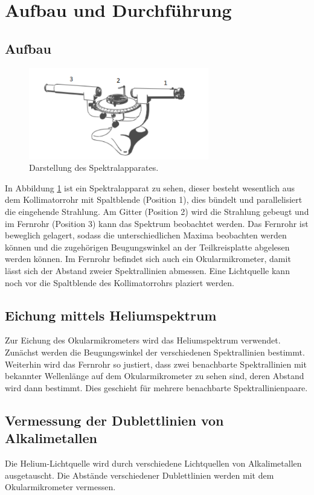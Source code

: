 \newpage
\section{Aufbau und Durchführung}
\label{sec:Durchführung}
\subsection{Aufbau}
\begin{figure}
 \centering
 \includegraphics[width=0.7\textwidth]{Aufbau.png}
 \caption{Darstellung des Spektralapparates.\cite{sample}}
 \label{fig:apparat}
 \end{figure}
In Abbildung \ref{fig:apparat} ist ein Spektralapparat zu sehen, dieser besteht wesentlich aus dem Kollimatorrohr mit Spaltblende (Position 1), dies bündelt und parallelisiert die eingehende Strahlung.
Am Gitter (Position 2) wird die Strahlung gebeugt und im Fernrohr (Position 3) kann das Spektrum beobachtet werden. Das Fernrohr ist beweglich gelagert, sodass die unterschiedlichen Maxima
beobachten werden können und die zugehörigen Beugungswinkel an der Teilkreisplatte abgelesen werden können. Im Fernrohr befindet sich auch ein Okularmikrometer, damit lässt sich der Abstand
zweier Spektrallinien abmessen.
Eine Lichtquelle kann noch vor die Spaltblende des Kollimatorrohrs plaziert werden.

\subsection{Eichung mittels Heliumspektrum}
Zur Eichung des Okularmikrometers wird das Heliumspektrum verwendet. Zunächst werden die Beugungswinkel der verschiedenen Spektrallinien bestimmt.
Weiterhin wird das Fernrohr so justiert, dass zwei benachbarte Spektrallinien mit bekannter Wellenlänge auf dem Okularmikrometer zu sehen sind, deren Abstand wird dann bestimmt.
Dies geschieht für mehrere benachbarte Spektrallinienpaare.

\subsection{Vermessung der Dublettlinien von Alkalimetallen}
Die Helium-Lichtquelle wird durch verschiedene Lichtquellen von Alkalimetallen ausgetauscht.
Die Abstände verschiedener Dublettlinien werden mit dem Okularmikrometer vermessen.
